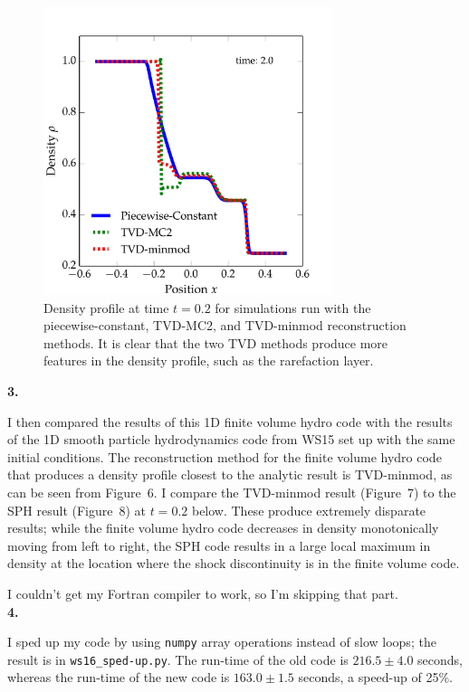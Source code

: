\documentclass{article}
\begin{document}
\begin{spacing}{1.1}
\begin{figure}[H]
 \centering
 \hspace{0cm} \includegraphics[width=0.75\textwidth]{comparison.pdf}
 \caption{Density profile at time \(t = 0.2\) for simulations run with the piecewise-constant, TVD-MC2, and TVD-minmod reconstruction methods. It is clear that the two TVD methods produce more features in the density profile, such as the rarefaction layer.}
\end{figure}

\noindent \textbf{3.}

I then compared the results of this 1D finite volume hydro code with the results of the 1D smooth particle hydrodynamics code from WS15 set up with the same initial conditions. The reconstruction method for the finite volume hydro code that produces a density profile closest to the analytic result is TVD-minmod, as can be seen from Figure~6. I compare the TVD-minmod result (Figure~7) to the SPH result (Figure~8) at \(t = 0.2\) below. These produce extremely disparate results; while the finite volume hydro code decreases in density monotonically moving from left to right, the SPH code results in a large local maximum in density at the location where the shock discontinuity is in the finite volume code. 

I couldn't get my Fortran compiler to work, so I'm skipping that part.\\

\noindent \textbf{4.}

I sped up my code by using \texttt{numpy} array operations instead of slow loops; the result is in \texttt{ws16\_sped-up.py}. The run-time of the old code is \(216.5 \pm 4.0\) seconds, whereas the run-time of the new code is \(163.0 \pm 1.5\) seconds, a speed-up of 25\%.


\end{spacing}
\end{document}
